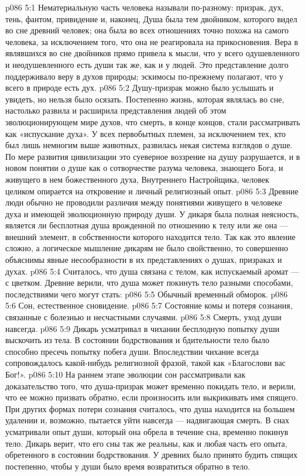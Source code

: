 \vs p086 5:1 Нематериальную часть человека называли по\hyp{}разному: призрак, дух, тень, фантом, привидение и, наконец,  Душа была тем двойником, которого видел во сне древний человек; она была во всех отношениях точно похожа на самого человека, за исключением того, что она не реагировала на прикосновения. Вера в являвшихся во сне двойников прямо привела к мысли, что у всего одушевленного и неодушевленного есть души так же, как и у людей. Это представление долго поддерживало веру в духов природы; эскимосы по\hyp{}прежнему полагают, что у всего в природе есть дух.
\vs p086 5:2 Душу\hyp{}призрак можно было услышать и увидеть, но нельзя было осязать. Постепенно жизнь, которая являлась во сне, настолько развила и расширила представления людей об этом эволюционирующем мире духов, что смерть, в конце концов, стали рассматривать как «испускание духа». У всех первобытных племен, за исключением тех, кто был лишь немногим выше животных, развилась некая система взглядов о душе. По мере развития цивилизации это суеверное воззрение на душу разрушается, и в новом понятии о душе как о сотворчестве разума человека, знающего Бога, и живущего в нем божественного духа, Внутреннего Настройщика, человек целиком опирается на откровение и личный религиозный опыт.
\vs p086 5:3 Древние люди обычно не проводили различия между понятиями живущего в человеке духа и имеющей эволюционную природу души. У дикаря была полная неясность, является ли бесплотная душа врожденной по отношению к телу или же она --- внешний элемент, в собственности которого находится тело. Так как это явление сложно, а логическое мышление дикарям не было свойственно, то совершенно объяснимы явные несообразности в их представлениях о душах, призраках и духах.
\vs p086 5:4 Считалось, что душа связана с телом, как испускаемый аромат --- с цветком. Древние верили, что душа может покинуть тело разными способами, последствиями чего могут стать:
\vs p086 5:5 \bibnobreakspace Обычный временный обморок.
\vs p086 5:6 \bibnobreakspace Сон, естественное сновидение.
\vs p086 5:7 \bibnobreakspace Состояние комы и потеря сознания, связанные с болезнью и несчастными случаями.
\vs p086 5:8 \bibnobreakspace Смерть, уход души навсегда.
\vs p086 5:9 \pc Дикарь усматривал в чихании бесплодную попытку души выскочить из тела. В состоянии бодрствования и бдительности тело было способно пресечь попытку побега души. Впоследствии чихание всегда сопровождалось какой\hyp{}нибудь религиозной фразой, такой как «Благослови вас Бог!».
\vs p086 5:10 \pc На раннем этапе эволюции сон рассматривали как доказательство того, что душа\hyp{}призрак может временно покидать тело, и верили, что ее можно призвать обратно, если произносить или выкрикивать имя спящего. При других формах потери сознания считалось, что душа находится на большем удалении и, возможно, пытается уйти навсегда --- надвигающая смерть. В снах усматривали опыт души, который она обрела в течение сна, временно покинув тело. Дикарь верит, что его сны так же реальны, как и любая часть его опыта, обретенного в состоянии бодрствования. У древних было принято будить спящих постепенно, чтобы у души было время возвратиться обратно в тело.
